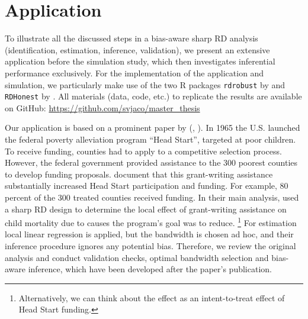 


\section{Application} \label{sec:application}

To illustrate all the discussed steps in a bias-aware sharp RD analysis (identification, estimation, inference, validation),
we present an extensive application before the simulation study,
which then investigates inferential performance exclusively.
For the implementation of the application and simulation,
we particularly make use of the two \textsf{R} packages \texttt{rdrobust} by \citeauthor{Calonico_2019} and \texttt{RDHonest} by \citeauthor{Armstrong_2020}.
All materials (data, code, etc.) to replicate the results are available on GitHub:
\url{https://github.com/svjaco/master_thesis}

Our application is based on a prominent paper by \citeauthor{Ludwig_2007} (\citeyear{Ludwig_2007}, ).
In 1965 the U.S. launched the federal poverty alleviation program \enquote{Head Start}, targeted at poor children.
To receive funding, counties had to apply to a competitive selection process.
However, the federal government provided assistance to the 300 poorest counties to develop funding proposals.
\textcite[e.g.\ Figure I and II]{Ludwig_2007} document that this grant-writing assistance substantially increased Head Start participation and funding.
For example, 80 percent of the 300 treated counties received funding.
In their main analysis, \citeauthor{Ludwig_2007} used a sharp RD design to determine the local effect of grant-writing assistance
on child mortality due to causes the program's goal was to reduce.%
\footnote{Alternatively, we can think about the effect as an intent-to-treat effect of Head Start funding.} 
For estimation local linear regression is applied, but the bandwidth is chosen ad hoc, and their inference procedure ignores any potential bias.
Therefore, we review the original analysis and conduct validation checks, optimal bandwidth selection and bias-aware inference,
which have been developed after the paper's publication.

